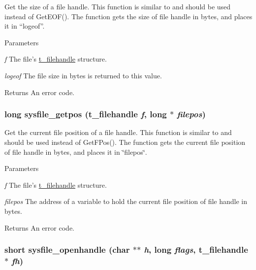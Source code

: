 Get the size of a file handle. This function is similar to and should be used instead of GetEOF(). The function gets the size of file handle in bytes, and places it in “logeof”.


\begin{DoxyParams}{Parameters}
\item[{\em f}]The file's \hyperlink{group__files_gafcb776aa74d514754e83b30995b5a5d1}{t\_\-filehandle} structure. \item[{\em logeof}]The file size in bytes is returned to this value. \end{DoxyParams}
\begin{DoxyReturn}{Returns}
An error code. 
\end{DoxyReturn}
\hypertarget{group__files_ga01c1a63930d986e9661efe25ddbdecd6}{
\subsubsection[{sysfile\_\-getpos}]{\setlength{\rightskip}{0pt plus 5cm}long sysfile\_\-getpos ({\bf t\_\-filehandle} {\em f}, \/  long $\ast$ {\em filepos})}}
\label{group__files_ga01c1a63930d986e9661efe25ddbdecd6}


Get the current file position of a file handle. This function is similar to and should be used instead of GetFPos(). The function gets the current file position of file handle in bytes, and places it in \char`\"{}filepos\char`\"{}.


\begin{DoxyParams}{Parameters}
\item[{\em f}]The file's \hyperlink{group__files_gafcb776aa74d514754e83b30995b5a5d1}{t\_\-filehandle} structure. \item[{\em filepos}]The address of a variable to hold the current file position of file handle in bytes. \end{DoxyParams}
\begin{DoxyReturn}{Returns}
An error code. 
\end{DoxyReturn}
\hypertarget{group__files_ga493776146a2eabc5857519950f938012}{
\subsubsection[{sysfile\_\-openhandle}]{\setlength{\rightskip}{0pt plus 5cm}short sysfile\_\-openhandle (char $\ast$$\ast$ {\em h}, \/  long {\em flags}, \/  {\bf t\_\-filehandle} $\ast$ {\em fh})}}
\label{group__files_ga493776146a2eabc5857519950f938012}



